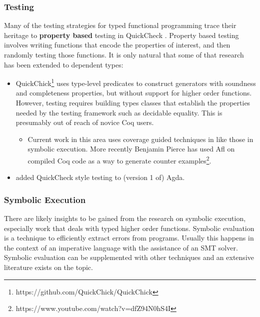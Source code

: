\subsubsection{Testing}
 
Many of the testing strategies for typed functional programming trace their heritage to \textbf{property based} testing in QuickCheck \cite{quickcheck}.
Property based testing involves writing functions that encode the properties of interest, and then randomly testing those functions.
It is only natural that some of that research has been extended to dependent types:
\begin{itemize}
\item
QuickChick\footnote{https://github.com/QuickChick/QuickChick} \cite{denes2014quickchick,lampropoulos2017generating,lampropoulos2017beginner,lampropoulos2018random}
 uses type-level predicates to construct generators with soundness and completeness properties, but without support for higher order functions.
However, testing requires building types classes that establish the properties needed by the testing framework such as decidable equality.
This is presumably out of reach of novice Coq users.
\begin{itemize}
\item
Current work in this area uses coverage guided techniques in \cite{lampropoulos2019coverage} like those in symbolic execution.
More recently Benjamin Pierce has used Afl on compiled Coq code as a way to generate counter examples\footnote{https://www.youtube.com/watch?v=dfZ94N0hS4I}.
\end{itemize}
\item \cite{dybjer2003combining} added QuickCheck style testing to (version 1 of) Agda.
\end{itemize}
 
\subsubsection{Symbolic Execution}
 
There are likely insights to be gained from the research on symbolic execution, especially work that deals with typed higher order functions.
Symbolic evaluation is a technique to efficiently extract errors from programs.
Usually this happens in the context of an imperative language with the assistance of an SMT solver.
Symbolic evaluation can be supplemented with other techniques and an extensive literature exists on the topic.
 
